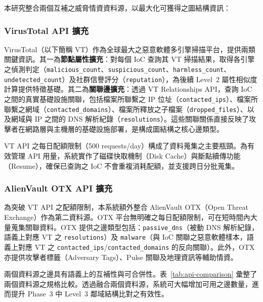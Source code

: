 \begin{ZhChapter}
本研究整合兩個互補之威脅情資資料源，以最大化可獲得之圖結構資訊：

\subsubsection{VirusTotal API 擴充}

VirusTotal（以下簡稱 VT）作為全球最大之惡意軟體多引擎掃描平台，提供兩類關鍵資訊。其一為\textbf{節點屬性擴充}：對每個 IoC 查詢其 VT 掃描結果，取得各引擎之偵測判定（\texttt{malicious\_count}、\texttt{suspicious\_count}、\texttt{harmless\_count}、\texttt{undetected\_count}）及社群信譽評分（\texttt{reputation}），為後續 Level~2 屬性相似度計算提供特徵基礎。其二為\textbf{關聯邊擴充}：透過 VT Relationships API，查詢 IoC 之間的真實基礎設施關聯，包括檔案所聯繫之 IP 位址（\texttt{contacted\_ips}）、檔案所聯繫之網域（\texttt{contacted\_domains}）、檔案所釋放之子檔案（\texttt{dropped\_files}）、以及網域與 IP 之間的 DNS 解析紀錄（\texttt{resolutions}）。這些關聯關係直接反映了攻擊者在網路層與主機層的基礎設施部署，是構成圖結構之核心邊類型。

VT API 之每日配額限制（500 requests/day）構成了資料蒐集之主要瓶頸。為有效管理 API 用量，系統實作了磁碟快取機制（Disk Cache）與斷點續傳功能（Resume），確保已查詢之 IoC 不會重複消耗配額，並支援跨日分批蒐集。

\subsubsection{AlienVault OTX API 擴充}

為突破 VT API 之配額限制，本系統額外整合 AlienVault OTX（Open Threat Exchange）作為第二資料源。OTX 平台無明確之每日配額限制，可在短時間內大量蒐集關聯資料。OTX 提供之邊類型包括：\texttt{passive\_dns}（被動 DNS 解析紀錄，語義上對應 VT 之 \texttt{resolutions}）及 \texttt{malware}（與 IoC 關聯之惡意軟體樣本，語義上對應 VT 之 \texttt{contacted\_ips}/\texttt{contacted\_domains} 的反向關聯）。此外，OTX 亦提供攻擊者標籤（Adversary Tags）、Pulse 關聯及地理資訊等輔助情資。

兩個資料源之邊具有語義上的互補性與可合併性。表~\ref{tab:api-comparison} 彙整了兩個資料源之規格比較。透過融合兩個資料源，系統可大幅增加可用之邊數量，進而提升 Phase~3 中 Level~3 鄰域結構比對之有效性。


\end{ZhChapter}
